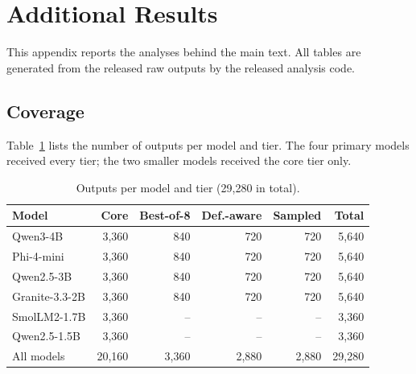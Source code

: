 \documentclass[conference,compsoc]{IEEEtran}
\begin{document}
\section{Additional Results}\label{app:results}
This appendix reports the analyses behind the main text. All tables are generated from the released raw outputs by the released analysis code.

\subsection{Coverage}
Table~\ref{tab:coverage} lists the number of outputs per model and tier. The four primary models received every tier; the two smaller models received the core tier only.
\begin{table}[H]
\centering\small
\caption{Outputs per model and tier (29,280 in total).}
\label{tab:coverage}
\begin{tabular}{@{}lrrrrr@{}}
\toprule
Model & Core & Best-of-8 & Def.-aware & Sampled & Total \\
\midrule
Qwen3-4B & 3,360 & 840 & 720 & 720 & 5,640 \\
Phi-4-mini & 3,360 & 840 & 720 & 720 & 5,640 \\
Qwen2.5-3B & 3,360 & 840 & 720 & 720 & 5,640 \\
Granite-3.3-2B & 3,360 & 840 & 720 & 720 & 5,640 \\
SmolLM2-1.7B & 3,360 & -- & -- & -- & 3,360 \\
Qwen2.5-1.5B & 3,360 & -- & -- & -- & 3,360 \\
\midrule
All models & 20,160 & 3,360 & 2,880 & 2,880 & 29,280 \\
\bottomrule
\end{tabular}
\end{table}
\end{document}
